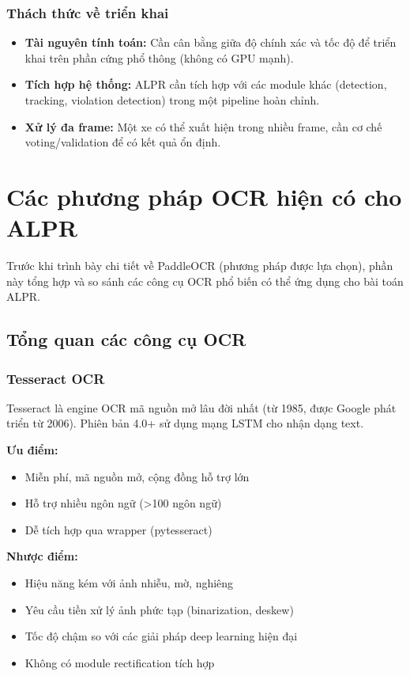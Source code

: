 \subsubsection{Thách thức về triển khai}
\begin{itemize}
    \item \textbf{Tài nguyên tính toán:} Cần cân bằng giữa độ chính xác và tốc độ để triển khai trên phần cứng phổ thông (không có GPU mạnh).
    \item \textbf{Tích hợp hệ thống:} ALPR cần tích hợp với các module khác (detection, tracking, violation detection) trong một pipeline hoàn chỉnh.
    \item \textbf{Xử lý đa frame:} Một xe có thể xuất hiện trong nhiều frame, cần cơ chế voting/validation để có kết quả ổn định.
\end{itemize}

\section{Các phương pháp OCR hiện có cho ALPR}

Trước khi trình bày chi tiết về PaddleOCR (phương pháp được lựa chọn), phần này tổng hợp và so sánh các công cụ OCR phổ biến có thể ứng dụng cho bài toán ALPR.

\subsection{Tổng quan các công cụ OCR}

\subsubsection{Tesseract OCR}
Tesseract \cite{smith2007overview} là engine OCR mã nguồn mở lâu đời nhất (từ 1985, được Google phát triển từ 2006). Phiên bản 4.0+ sử dụng mạng LSTM cho nhận dạng text.

\textbf{Ưu điểm:}
\begin{itemize}
    \item Miễn phí, mã nguồn mở, cộng đồng hỗ trợ lớn
    \item Hỗ trợ nhiều ngôn ngữ (>100 ngôn ngữ)
    \item Dễ tích hợp qua wrapper (pytesseract)
\end{itemize}

\textbf{Nhược điểm:}
\begin{itemize}
    \item Hiệu năng kém với ảnh nhiễu, mờ, nghiêng
    \item Yêu cầu tiền xử lý ảnh phức tạp (binarization, deskew)
    \item Tốc độ chậm so với các giải pháp deep learning hiện đại
    \item Không có module rectification tích hợp
\end{itemize}

